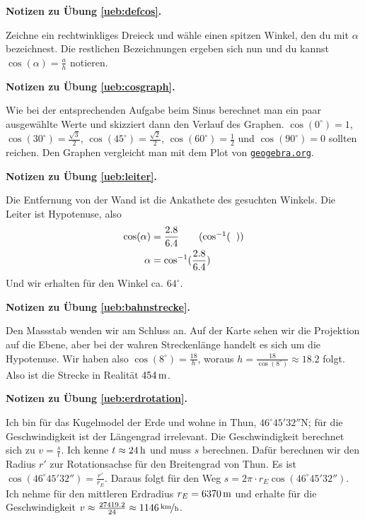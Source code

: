 \documentclass[%
11pt,%
twoside,%
titlepage,%
german,%
headsepline%
]{scrartcl}
\newcommand{\geogebralink}{\href{https://www.geogebra.org/calculator}{\texttt{geogebra.org}}}
\newcommand{\concatueb}[1]{ueb:#1}%
\newcommand{\concatlsg}[1]{lsg:#1}%
\newenvironment{lsg}[1]{%
    \par\noindent\textbf{Notizen zu Übung \ref{\concatueb{#1}}.}%
    \label{\concatlsg{#1}}
}{%
    \par%
}
\begin{document}
\begin{lsg}{defcos}
Zeichne ein rechtwinkliges Dreieck und w\"ahle einen spitzen Winkel, den du mit $\alpha$ bezeichnest. Die restlichen Bezeichnungen ergeben sich nun und du kannst $\cos(\alpha)=\frac{a}{h}$ notieren.
\end{lsg}

\begin{lsg}{cosgraph}
Wie bei der entsprechenden Aufgabe beim Sinus berechnet man ein paar ausgew\"ahlte Werte und skizziert dann den Verlauf des Graphen. $\cos(0^{\circ})=1$, $\cos(30^{\circ})=\frac{\sqrt{3}}{2}$, $\cos(45^{\circ})=\frac{\sqrt{2}}{2}$, $\cos(60^{\circ})=\frac{1}{2}$ und $\cos(90^{\circ})=0$ sollten reichen. Den Graphen vergleicht man mit dem Plot von \geogebralink.
\end{lsg}

\begin{lsg}{leiter}
Die Entfernung von der Wand ist die Ankathete des gesuchten Winkels. Die Leiter ist Hypotenuse, also
\begin{align*}
\cos(\alpha) &= \frac{2.8}{6.4}\tag{$\cos^{-1}(\phantom{x})$}\\
\alpha &= \cos^{-1}(\frac{2.8}{6.4})
\end{align*}
Und wir erhalten f\"ur den Winkel ca. $64^{\circ}$.
\end{lsg}

\begin{lsg}{bahnstrecke}
Den Massstab wenden wir am Schluss an. Auf der Karte sehen wir die Projektion auf die Ebene, aber bei der wahren Streckenl\"ange handelt es sich um die Hypotenuse. Wir haben also $\cos(8^{\circ})=\frac{18}{h}$, woraus $h=\frac{18}{\cos(8^{\circ})}\approx18.2$ folgt. Also ist die Strecke in Realit\"at $\unit[454]{m}$.
\end{lsg}

\begin{lsg}{erdrotation}
Ich bin f\"ur das Kugelmodel der Erde und wohne in Thun, $46^{\circ}45'32''$N; f\"ur die Geschwindigkeit ist der L\"angengrad irrelevant. Die Geschwindigkeit berechnet sich zu $v=\frac{s}{t}$. Ich kenne $t\approx\unit[24]{h}$ und muss $s$ berechnen. Daf\"ur berechnen wir den Radius $r'$ zur Rotationsachse f\"ur den Breitengrad von Thun. Es ist $\cos(46^{\circ}45'32'')=\frac{r'}{r_{E}}$. Daraus folgt f\"ur den Weg $s=2\pi\cdot r_{E}\cos(46^{\circ}45'32'')$. Ich nehme f\"ur den mittleren Erdradius $r_{E}=\unit[6370]{m}$ und erhalte f\"ur die Geschwindigkeit $v\approx\frac{27419.2}{24}\approx\unitfrac[1146]{km}{h}$.
\end{lsg}
\end{document}
